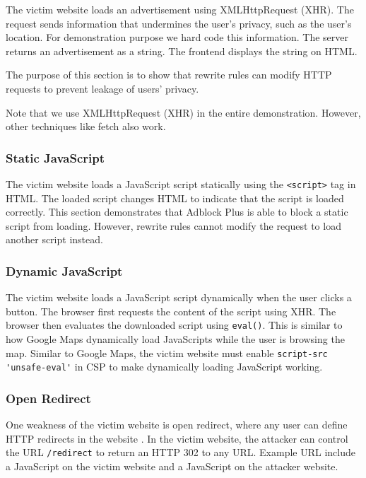 \documentclass[conference]{IEEEtran}
\begin{document}
The victim website loads an advertisement using XMLHttpRequest (XHR). The request sends information that undermines the user's privacy, such as the user's location. For demonstration purpose we hard code this information. The server returns an advertisement as a string. The frontend displays the string on HTML.

The purpose of this section is to show that rewrite rules can modify HTTP requests to prevent leakage of users' privacy.

Note that we use XMLHttpRequest (XHR) in the entire demonstration. However, other techniques like fetch also work.

\subsubsection{Static JavaScript}

The victim website loads a JavaScript script statically using the \lstinline{<script>} tag in HTML. The loaded script changes HTML to indicate that the script is loaded correctly. This section demonstrates that Adblock Plus is able to block a static script from loading. However, rewrite rules cannot modify the request to load another script instead.

\subsubsection{Dynamic JavaScript}

The victim website loads a JavaScript script dynamically when the user clicks a button. The browser first requests the content of the script using XHR. The browser then evaluates the downloaded script using \lstinline{eval()}. This is similar to how Google Maps dynamically load JavaScripts while the user is browsing the map. Similar to Google Maps, the victim website must enable \lstinline{script-src 'unsafe-eval'} in CSP to make dynamically loading JavaScript working.

\subsubsection{Open Redirect}

One weakness of the victim website is open redirect, where any user can define HTTP redirects in the website \cite{cwe_open_redir}. In the victim website, the attacker can control the URL \lstinline{/redirect} to return an HTTP 302 to any URL. Example URL include a JavaScript on the victim website and a JavaScript on the attacker website.
\end{document}
